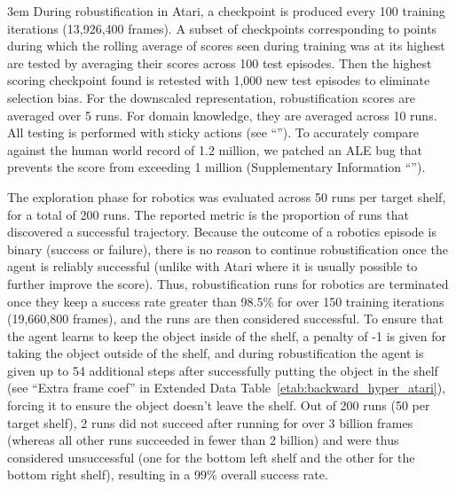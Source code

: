 \documentclass{nature}
\renewcommand*{\cite}[1]{\supercite{#1}}
\begin{document}
\begin{methods}
\emergencystretch 3em  During robustification in Atari, a checkpoint is produced every 100 training iterations (13,926,400 frames).
A subset of checkpoints corresponding to points during which the rolling average of scores seen during training was at its highest are tested by averaging their scores across 100 test episodes.
Then the highest scoring checkpoint found is retested with 1,000 new test episodes to eliminate selection bias.
For the downscaled representation, robustification scores are averaged over 5 runs.
For domain knowledge, they are averaged across 10 runs. All testing is performed with sticky actions (see ``''). 
To accurately compare against the human world record of 1.2 million\cite{atari_scoreboard}, we patched an ALE bug that prevents the score from exceeding 1 million (Supplementary Information ``'').

The exploration phase for robotics was evaluated across 50 runs per target shelf, for a total of 200 runs. The reported metric is the proportion of runs that discovered a successful trajectory. Because the outcome of a robotics episode is binary (success or failure), there is no reason to continue robustification once the agent is reliably successful (unlike with Atari where it is usually possible to further improve the score).
Thus, robustification runs for robotics are terminated once they keep a success rate greater than 98.5\% for over 150 training iterations (19,660,800 frames), and the runs are then considered successful.
To ensure that the agent learns to keep the object inside of the shelf, a penalty of -1 is given for taking the object outside of the shelf, and during robustification the agent is given up to 54 additional steps after successfully putting the object in the shelf (see ``Extra frame coef'' in Extended Data Table~\ref{etab:backward_hyper_atari}), forcing it to ensure the object doesn't leave the shelf.
Out of 200 runs (50 per target shelf), 2 runs did not succeed after running for over 3 billion frames (whereas all other runs succeeded in fewer than 2 billion) and were thus considered unsuccessful (one for the bottom left shelf and the other for the bottom right shelf), resulting in a 99\% overall success rate. 


\end{methods}
\end{document}
